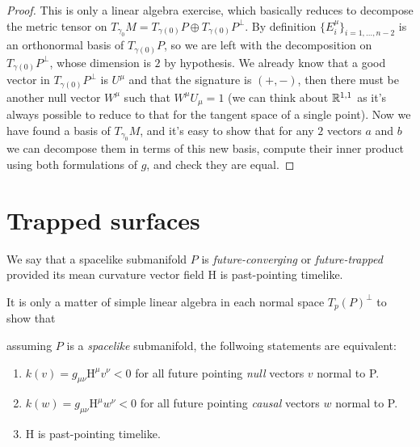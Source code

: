 \begin{proof}
	This is only a linear algebra exercise, which basically reduces to decompose the metric tensor on \(T_{\gamma_0}M = T_{\gamma(0)}P \oplus T_{\gamma(0)}P^{\perp}\). By definition \(\{E_i^{\mu}\}_{i = 1, \ldots, n - 2}\) is an orthonormal basis of \(T_{\gamma(0)}P\), so we are left with the decomposition on \(T_{\gamma(0)}P^{\perp}\), whose dimension is \(2\) by hypothesis.
	We already know that a good vector in \(T_{\gamma(0)}P^{\perp}\) is \(U^{\mu}\) and that the signature is \((+, -)\), then there must be another null vector \(W^{\mu}\) such that \(W^{\mu}U_{\mu} = 1\) (we can think about \({\mathbb{R}}^{1,1}\) as it's always possible to reduce to that for the tangent space of a single point). Now we have found a basis of \(T_{\gamma_0}M\), and it's easy to show that for any \(2\) vectors \(a\) and \(b\) we can decompose them in terms of this new basis, compute their inner product using both formulations of \(g\), and check they are equal.
\end{proof}

\section{Trapped surfaces}

\begin{definition}
	\label{def:trapped-surface}
	We say that a spacelike submanifold \(P\) is \emph{future-converging} or \emph{future-trapped} provided its mean curvature vector field \(\mathrm{H}\) is past-pointing timelike.
\end{definition}


It is only a matter of simple linear algebra in each normal space \(T_p(P)^{\perp}\) to show that
\begin{lemma} \label{lemma:charact-trapped}
	assuming \(P\) is a \emph{spacelike} submanifold, the follwoing statements are equivalent:
	\begin{enumerate}
		\item  \(k(v) =g_{\mu\nu}\mathrm{H}^{\mu} v^{\nu} < 0 \) for all future pointing \emph{null} vectors \(v\) normal to P.
		\item  \(k(w) =g_{\mu\nu}\mathrm{H}^{\mu} w^{\nu} < 0 \) for all future pointing \emph{causal} vectors \(w\) normal to P.
		\item \(\mathrm{H}\) is past-pointing timelike.
	\end{enumerate}
\end{lemma}

